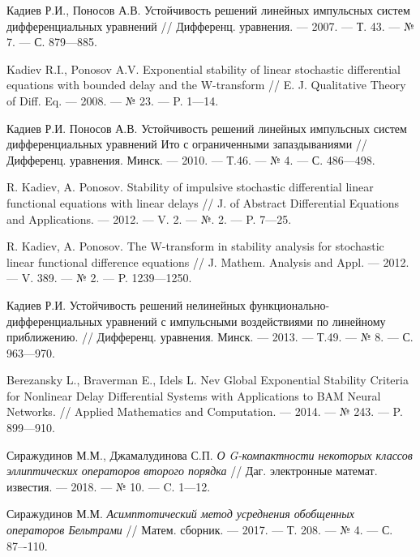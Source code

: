 \begin{thebibliography}{111}
	Кадиев Р.И., Поносов А.В. Устойчивость решений линейных импульсных систем дифференциальных уравнений // Дифференц. уравнения. --- 2007. --- Т. 43. --- № 7. --- С. 879---885.
	
	

	Kadiev R.I., Ponosov A.V. Exponential stability of linear stochastic differential equations with bounded delay and the W-transform // E. J. Qualitative Theory of Diff. Eq. --- 2008. --- № 23. --- P. 1---14.
	
	

	Кадиев Р.И. Поносов А.В. Устойчивость решений линейных импульсных систем дифференциальных уравнений Ито с ограниченными запаздываниями // Дифференц. уравнения. Минск. --- 2010. --- Т.46. --- № 4. --- С. 486---498.
	
	

	R. Kadiev, A. Ponosov. Stability of impulsive stochastic differential linear functional	equations with linear delays // J. of Abstract Differential Equations and Applications. --- 2012. --- V. 2. --- №. 2. --- P. 7---25.
	
	

	R. Kadiev, A. Ponosov. The W-transform in stability analysis for stochastic linear functional difference equations // J. Mathem. Analysis and Appl. --- 2012. --- V. 389. --- № 2. --- P. 1239---1250.
	
	

	Кадиев Р.И. Устойчивость решений нелинейных функционально-дифференциальных уравнений с импульсными воздействиями по линейному приближению. // Дифференц. уравнения. Минск. --- 2013. --- Т.49. --- № 8. --- С. 963---970.
	
	

	Berezansky L., Braverman E., Idels L. Nev Global Exponential Stability Criteria for	Nonlinear Delay Differential Systems with Applications to BAM Neural Networks. // Applied Mathematics and Computation. --- 2014. --- № 243. --- P. 899---910.
	
	

Сиражудинов М.М., Джамалудинова С.П. \emph{О G-компактности некоторых классов эллиптических операторов второго порядка} // Даг. электронные математ. известия. --- 2018. --- № 10. --- C. 1---12.



Сиражудинов М.М. \emph{ Асимптотический метод усреднения обобщенных операторов Бельтрами} // Матем. сборник. --- 2017. --- Т. 208. --- № 4. --- С. 87–-110.




\end{thebibliography}
